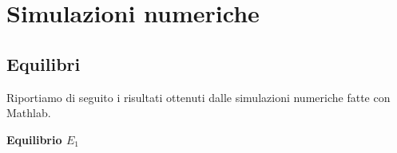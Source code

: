 \documentclass[12pt,a4paper]{article}
\numberwithin{theorem}{section}
\numberwithin{definition}{section}
\numberwithin{example}{section}
\newcommand{\deftitle}[1]{{\color{red}\bf{#1}\color{black}}}
\begin{document}
\begin{itemize}
\end{itemize}


\newpage
\section{Simulazioni numeriche}
\subsection{Equilibri}
Riportiamo di seguito i risultati ottenuti dalle simulazioni numeriche fatte con Mathlab.

\bigskip
\deftitle{Equilibrio $E_1$}
\end{document}
